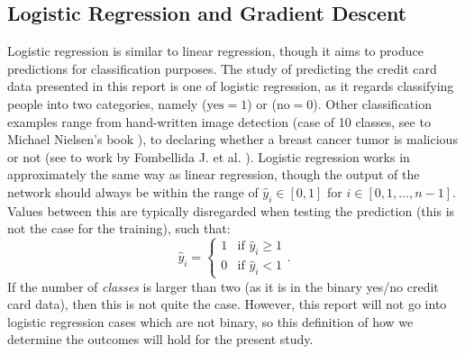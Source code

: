     \subsection{Logistic Regression and Gradient Descent}
        Logistic regression is similar to linear regression, though it aims to produce predictions for classification purposes. The study of predicting the credit card data presented in this report is one of logistic regression, as it regards classifying people into two categories, namely ($\text{yes}=1$) or ($\text{no}=0$). Other classification examples range from hand-written image detection (case of 10 classes, see to Michael Nielsen's book \cite{nielsenneural}), to declaring whether a breast cancer tumor is malicious or not (see to work by Fombellida J. et al. \cite{breastcancer}). Logistic regression works in approximately the same way as linear regression, though the output of the network should always be within the range of $\hat{y}_i\in [0,1]$ for $i \in [0,1,\hdots,n-1]$. Values between this are typically disregarded when testing the prediction (this is not the case for the training), such that:
        \begin{equation}
            \hat{y}_i = \begin{cases} 1 & \text{if } \hat{y}_i\geq 1 \\ 0 & \text{if } \hat{y}_i < 1 \end{cases}.
        \end{equation}
        If the number of \textit{classes} is larger than two (as it is in the binary yes/no credit card data), then this is not quite the case. However, this report will not go into logistic regression cases which are not binary, so this definition of how we determine the outcomes will hold for the present study.
